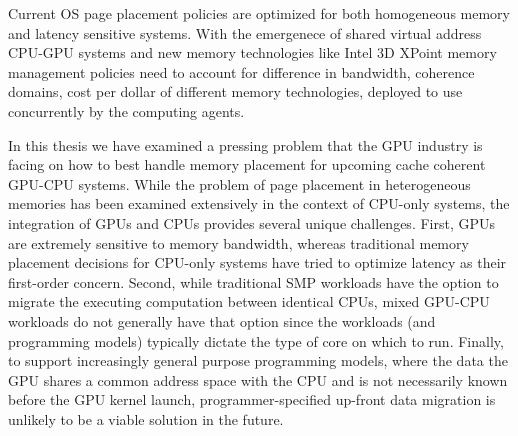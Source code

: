 Current OS page placement policies are optimized for both homogeneous memory and
latency sensitive systems. With the emergenece of shared virtual address CPU-GPU
systems and new memory technologies like Intel 3D XPoint memory management
policies need to account for difference in bandwidth, coherence domains, cost
per dollar of different memory technologies, deployed to use concurrently by the
computing agents.

In this thesis we have examined a pressing problem that the GPU industry is
facing on how to best handle memory placement for upcoming cache coherent
GPU-CPU systems.  While the problem of page placement in heterogeneous memories
has been examined extensively in the context of CPU-only systems, the
integration of GPUs and CPUs provides several unique challenges.  First, GPUs
are extremely sensitive to memory bandwidth, whereas traditional memory
placement decisions for CPU-only systems have tried to optimize latency as their
first-order concern.  Second, while traditional SMP workloads have the option to
migrate the executing computation between identical CPUs, mixed GPU-CPU
workloads do not generally have that option since the workloads (and programming
models) typically dictate the type of core on which to run.  
Finally, to support increasingly general purpose programming models, where the
data the GPU shares a common address space with the CPU and is not necessarily
known before the GPU kernel launch, programmer-specified up-front data migration
is unlikely to be a viable solution in the future.

